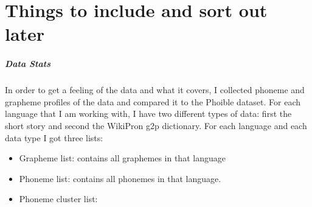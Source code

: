 \section{Things to include and sort out later}
\subparagraph{Data Stats}
In order to get a feeling of the data and what it covers, I collected phoneme and grapheme profiles of the data and compared it to the Phoible dataset. For each language that I am working with, I have two different types of data: first the short story and second the WikiPron \ac{g2p} dictionary. For each language and each data type I got three lists:
\begin{itemize}
 \item Grapheme list: contains all graphemes in that language
 \item Phoneme list: contains all phonemes in that language. 
 \item Phoneme cluster list: 
\end{itemize}



